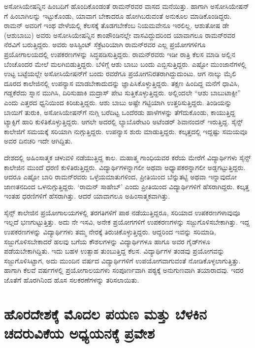 ಅಸೋಸಿಯೇಷನ್ನಿನ ಹಿಂಬದಿಗೆ ಹೊಂದಿಕೊಂಡಂತೆ ರಾಮನ್‍ರವರ ವಾಸದ ಮನೆಯಿತ್ತು. ಹಾಗಾಗಿ ಅಸೋಸಿಯೇಷನ್ ಗೆ ಹಿಂಬಾಗಿಲನ್ನು ಇಟ್ಟುಕೊಂಡು, ಯಾವಾಗ ಬೇಕಾದರೂ ಹೋಗಿ\-ಬರುವಂತೆ ಅನುಕೂಲ ಮಾಡಿಕೊಂಡಿದ್ದರು. ರಾಮನ್ ಅವರಿಗೆ ಇಂಥ ವೇಳೆಯಲ್ಲಿ ಕೆಲಸಕ್ಕೆ ತೊಡಗಬೇಕೆಂಬ ನಿಯಮವೇನೂ ಇರಲಿಲ್ಲ. ಆಶುತೋಷ ಡೇ (ಆಶುಬಾಬು) ಅವರು ಅಸೋಸಿಯೇಷನ್ನಿನ ಕಾಂಪೌಂಡಿನಲ್ಲೇ ವಾಸವಿದ್ದುದರಿಂದ ಯಾವಾಗಲೂ ರಾಮನ್‍ರವರ ನೆರವಿಗೆ ಬರುತ್ತಿದ್ದರು. ಅವರು ಅಸಿಸ್ಟಿಂಟ್ ಸೆಕ್ರೆಟರಿಯಾಗಿ ರಾಮನ್‍ರವರ ಎಲ್ಲ ಪ್ರಯೋಗಗಳಿಗೂ ಪ್ರಯೋಗಾಲಯದಲ್ಲಿ ಉಪ\-ಕರಣಗಳನ್ನು ಸಿದ್ಧಪಡಿಸುತ್ತಿದ್ದರು. ರಾಮನ್‍ರವರು ಇಡೀ ರಾತ್ರಿ ಕೆಲಸ ಮಾಡಿ ಅಲ್ಲಿನ ಬೆಂಚೊಂದರ ಮೇಲೆ ಮಲಗಿಬಿಡುತ್ತಿದ್ದರು. ಬೆಳಿಗ್ಗೆ ಆಶು ಬಾಬು ಬಂದು ಎಬ್ಬಿಸುತ್ತಿದ್ದರು. ಎಷ್ಟೋ ಮುಂಜಾನೆಗಳಲ್ಲಿ ಉಟ್ಟ ಬಟ್ಟೆಯಲ್ಲೇ ಅಸೋಸಿಯೇಷನ್‍ಗೆ ಬಂದು  ರವರೆಗೂ ಪ್ರಯೋಗನಿರತರಾಗಿದ್ದುದುಂಟು. ಆಗ ನಾಲ್ಕು ಮೈಲಿ ದೂರದ ಕಾಲೇಜಿನಲ್ಲಿ ಉಪನ್ಯಾಸ ಮಾಡಬೇಕಾದುದನ್ನು ಜ್ಞಾಪಿಸಿಕೊಳ್ಳುತ್ತಿದ್ದರು. ತಕ್ಷಣ ಹಿಂದಿದ್ದ ಮನೆಗೆ ಧಾವಿಸಿ, ಗಡ್ಡಕೆರೆದು ಸ್ನಾನ ಮುಗಿಸಿ, ದಿರಿಸುಹಾಕಿ ಮದ್ರಾಸ್ ಪೇಟ ಸುತ್ತಿಕೊಳ್ಳುತ್ತಿದ್ದರು. ಅಲ್ಲಿಂದಲೇ “ಆಶು ಬಾಬು\enginline{-}ಟಾಕ್ಸೀ” ಎಂದು ಎತ್ತರದ ಧ್ವನಿಯಿಂದ ಕಿರಿಚುತ್ತಿದ್ದರು. ಆಶು ಬಾಬು ಅಷ್ಟೇ ಗಟ್ಟಿಯಾಗಿ ಉತ್ತರಿಸುತ್ತಿದ್ದರು. ತಿಂಡಿಯನ್ನು ಬಾಯಿಗೆ ತುರುಕಿ, ಅಸೋಸಿಯೇಷನ್‍ಗೆ ನುಗ್ಗಿ ಬರೆದಿಟ್ಟ ಒಂದೆರಡು ಹಾಳೆಗಳನ್ನು ತೆಗೆದುಕೊಂಡು, ಕಾಯುತ್ತಿದ್ದ ಟ್ಯಾಕ್ಸಿಗೆ ಹಾರಿ ಕುಳಿತಿಕೊಳ್ಳುತ್ತಿದ್ದರು. ಆಗಲೇ ಅದರಲ್ಲಿ ಲ್ಯಾಬೊರೇಟರಿ ಅಟೆಂಡರ್ ಶಿವಾನಂದನ್ ಇರುತ್ತಿದ್ದ. ಸೈನ್ಸ್ ಕಾಲೇಜಿಗೆ ಸಮಯಕ್ಕೆ ಸರಿಯಾಗಿ ನುಗ್ಗುತ್ತಿದ್ದರು. ಉಪನ್ಯಾಸ ಶುರು ಮಾಡುತ್ತಿದ್ದರು. ಕಲ್ಕತ್ತದಲ್ಲಿ ಇದ್ದಷ್ಟು ಸಮಯವೂ ಅವರ ದಿನಚರಿ ಇದೇ ಆಗಿದ್ದಿತು.

ದೇಶದಲ್ಲಿ ಅಹಿಂಸಾತ್ಮಕ ಚಳುವಳಿ ನಡೆಯುತ್ತಿದ್ದ ಕಾಲ. ಮಹಾತ್ಮ ಗಾಂಧಿಯವರ ಕರೆಯ ಮೇರೆಗೆ ವಿದ್ಯಾರ್ಥಿಗಳು ಸೈನ್ಸ್ ಕಾಲೇಜಿನ ಮುಂದೆ ಧರಣಿ ಕುಳಿತಿರುತ್ತಿದ್ದರು. ವಿದ್ಯಾರ್ಥಿಗಳನ್ನಾಗಲೀ ಅಥವಾ ಅಧ್ಯಾಪಕರನ್ನಾಗಲೀ ಅಡ್ಡಗಟ್ಟುತ್ತಿದ್ದರು. ಆದರೂ ಎಷ್ಟೋ ಬಾರಿ ರಾಮನ್‍ರವರು ಒಳ್ಳೆಯಮಾತುಗಳಿಂದ, ಪ್ರೀತಿಯಿಂದ ಬೆನ್ನುತಟ್ಟಿ ಅಥವಾ ಇನ್ನಾವುದೋ ಜಾಣತನದಿಂದ ಒಳನುಗ್ಗುತ್ತಿದ್ದರು. ‘ರಾಮನ್ ಸಾಹೇಬ್’ ಎಂದು ಪ್ರೀತಿಯಿಂದ ವಿದ್ಯಾರ್ಥಿಗಳಿಗೆ ಹೆಸರಾಗಿದ್ದರು. ಕಲ್ಕತ್ತ ಇಂತಹ ಧರಣಿಗಳಿಗೆ ಹೆಸರಾಗಿತ್ತು. ಆದರೆ ಯಾವಾಗಲೂ ಅಹಿಂಸಾತ್ಮಕವಾಗಿತ್ತು. 

ಸೈನ್ಸ್ ಕಾಲೇಜಿನ ಪ್ರಯೋಗಾಲಯಗಳಲ್ಲಿ ತರಗತಿಗಳಿಗೆ ಪಾಠ ನಡೆಯುತ್ತಿದ್ದರೂ, ಸರಿಯಾದ ಉಪಕರಣಗಳಾವುವೂ ಇಲ್ಲದೆ ಭಣಗುಟ್ಟುತ್ತಿತ್ತು. ಅದು ನೇ ಇಸವಿ, ಅನೇಕ ಪ್ರಯೋಗಗಳಿಗೆ ಉಪಕರಣಗಳನ್ನು ಸಜ್ಜುಗೊಳಿಸಬೇಕಾಗಿತ್ತು. ಇದ್ದ ಉಪಕರಣಗಳನ್ನು ವಿದ್ಯಾರ್ಥಿಗಳು ತಮ್ಮ ನೇರಕ್ಕೆ ತಿರುಚಿಕೊಳ್ಳುತ್ತಿದ್ದರು. ಆದ್ದರಿಂದ ಇವನ್ನು ಸರಿಮಾಡಿ, ಸಜ್ಜುಗೊಳಿಸಬೇಕಾದರೆ ಹಲವು ಬಗೆಯ ಕೌಶಲಗಳನ್ನು ವಿದ್ಯಾರ್ಥಿಗಳೂ ಹಾಗೂ ಅವರ ಗೈಡ್‍ಗಳೂ ಪಡೆಯಬೇಕಾಗಿದ್ದಿತು. ಇದು ಬಹಳ ಉತ್ಸಾಹ ತುಂಬುತ್ತಿದ್ದ ಕೆಲಸ. ವಿದ್ಯಾರ್ಥಿಗಳ ತಂಡವು ಪ್ರಯೋಗವನ್ನು ಸಜ್ಜುಗೊಳಿಸಿಟ್ಟಾಗ, ಅದು ಮುಂದಿನ ವರ್ಷದ ವಿದ್ಯಾರ್ಥಿಗಳಿಗೆ ಉಪಯೋಗವಾಗುವಂತೆ ನೋಡಿಕೊಳ್ಳಲಾಗುತ್ತಿತ್ತು. ಹಾಗಾಗಿ ಕೆಲವೆ ವರ್ಷಗಳಲ್ಲಿ ಪ್ರಯೋಗಾಲಯಗಳು ಸಂಪೂರ್ಣವಾಗಿ  ಪಠ್ಯಕ್ಕೆ ಅನುಗುಣವಾಗಿ ತಯಾರಾದವು. ಇದರ ಜೊತೆಗೆ ಹೊರಗಿನಿಂದ ಹೊಸ ಸಲಕರಣೆಗಳನ್ನು ತರಿಸಲಾಯಿತು.


\section{ಹೊರದೇಶಕ್ಕೆ ಮೊದಲ ಪಯಣ ಮತ್ತು ಬೆಳಕಿನ ಚದರುವಿಕೆಯ ಅಧ್ಯಯನಕ್ಕೆ ಪ್ರವೇಶ}

